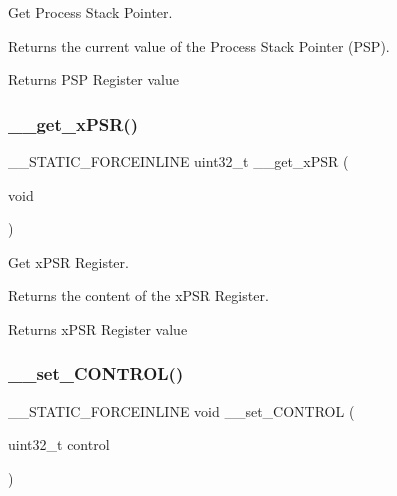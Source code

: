 Get Process Stack Pointer. 

Returns the current value of the Process Stack Pointer (P\+SP). \begin{DoxyReturn}{Returns}
P\+SP Register value 
\end{DoxyReturn}
\mbox{\label{group___c_m_s_i_s___core___reg_acc_functions_ga52ca795dc9429ee0ac64ddd12c034834}} 
\subsubsection{\texorpdfstring{\_\_get\_xPSR()}{\_\_get\_xPSR()}}
{\footnotesize\ttfamily \+\_\+\+\_\+\+S\+T\+A\+T\+I\+C\+\_\+\+F\+O\+R\+C\+E\+I\+N\+L\+I\+NE uint32\+\_\+t \+\_\+\+\_\+get\+\_\+x\+P\+SR (\begin{DoxyParamCaption}\item[{void}]{ }\end{DoxyParamCaption})}



Get x\+P\+SR Register. 

Returns the content of the x\+P\+SR Register. \begin{DoxyReturn}{Returns}
x\+P\+SR Register value 
\end{DoxyReturn}
\mbox{\label{group___c_m_s_i_s___core___reg_acc_functions_ga0102d0939d9b26c5c792be6bf5fd550f}} 
\subsubsection{\texorpdfstring{\_\_set\_CONTROL()}{\_\_set\_CONTROL()}}
{\footnotesize\ttfamily \+\_\+\+\_\+\+S\+T\+A\+T\+I\+C\+\_\+\+F\+O\+R\+C\+E\+I\+N\+L\+I\+NE void \+\_\+\+\_\+set\+\_\+\+C\+O\+N\+T\+R\+OL (\begin{DoxyParamCaption}\item[{uint32\+\_\+t}]{control }\end{DoxyParamCaption})}




